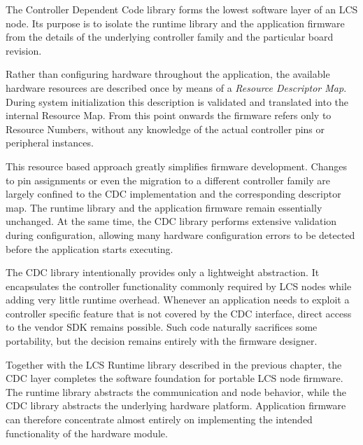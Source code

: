 
The Controller Dependent Code library forms the lowest software layer of an LCS
node. Its purpose is to isolate the runtime library and the application firmware
from the details of the underlying controller family and the particular board
revision.

Rather than configuring hardware throughout the application, the available
hardware resources are described once by means of a \emph{Resource Descriptor
Map}. During system initialization this description is validated and translated
into the internal Resource Map. From this point onwards the firmware refers only
to Resource Numbers, without any knowledge of the actual controller pins or
peripheral instances.

This resource based approach greatly simplifies firmware development. Changes to
pin assignments or even the migration to a different controller family are
largely confined to the CDC implementation and the corresponding descriptor map.
The runtime library and the application firmware remain essentially unchanged.
At the same time, the CDC library performs extensive validation during
configuration, allowing many hardware configuration errors to be detected before
the application starts executing.

The CDC library intentionally provides only a lightweight abstraction. It
encapsulates the controller functionality commonly required by LCS nodes while
adding very little runtime overhead. Whenever an application needs to exploit a
controller specific feature that is not covered by the CDC interface, direct
access to the vendor SDK remains possible. Such code naturally sacrifices some
portability, but the decision remains entirely with the firmware designer.

Together with the LCS Runtime library described in the previous chapter, the CDC
layer completes the software foundation for portable LCS node firmware. The
runtime library abstracts the communication and node behavior, while the CDC
library abstracts the underlying hardware platform. Application firmware can
therefore concentrate almost entirely on implementing the intended functionality
of the hardware module.
